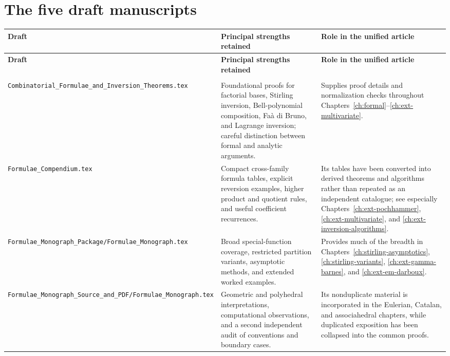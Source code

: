 \documentclass[11pt,a4paper,oneside,openany]{book}
\theoremstyle{definition}
\theoremstyle{remark}
\begin{document}
\section{The five draft manuscripts}
\renewcommand{\arraystretch}{1.15}
\begin{longtable}{>{\raggedright\arraybackslash}p{}
                  >{\raggedright\arraybackslash}p{}
                  >{\raggedright\arraybackslash}p{}}
\toprule
\textbf{Draft} & \textbf{Principal strengths retained} &
\textbf{Role in the unified article}\\
\midrule
\endfirsthead
\toprule
\textbf{Draft} & \textbf{Principal strengths retained} &
\textbf{Role in the unified article}\\
\midrule
\endhead
\midrule
\multicolumn{3}{r}{\small Continued on the next page}\\
\endfoot
\bottomrule
\endlastfoot

\nolinkurl{Combinatorial_Formulae_and_Inversion_Theorems.tex}
& Foundational proofs for factorial bases, Stirling inversion, Bell-polynomial
  composition, Fa\`a di Bruno, and Lagrange inversion; careful distinction
  between formal and analytic arguments.
& Supplies proof details and normalization checks throughout
  Chapters~\ref{ch:formal}--\ref{ch:ext-multivariate}.\\[1ex]

\nolinkurl{Formulae_Compendium.tex}
& Compact cross-family formula tables, explicit reversion examples, higher
  product and quotient rules, and useful coefficient recurrences.
& Its tables have been converted into derived theorems and algorithms rather
  than repeated as an independent catalogue; see especially
  Chapters~\ref{ch:ext-pochhammer}, \ref{ch:ext-multivariate}, and
  \ref{ch:ext-inversion-algorithms}.\\[1ex]

\nolinkurl{Formulae_Monograph_Package/Formulae_Monograph.tex}
& Broad special-function coverage, restricted partition variants, asymptotic
  methods, and extended worked examples.
& Provides much of the breadth in Chapters~\ref{ch:stirling-asymptotics},
  \ref{ch:stirling-variants}, \ref{ch:ext-gamma-barnes}, and
  \ref{ch:ext-em-darboux}.\\[1ex]

\nolinkurl{Formulae_Monograph_Source_and_PDF/Formulae_Monograph.tex}
& Geometric and polyhedral interpretations, computational observations, and a
  second independent audit of conventions and boundary cases.
& Its nonduplicate material is incorporated in the Eulerian, Catalan, and
  associahedral chapters, while duplicated exposition has been collapsed into
  the common proofs.\\[1ex]


\end{longtable}
\end{document}
